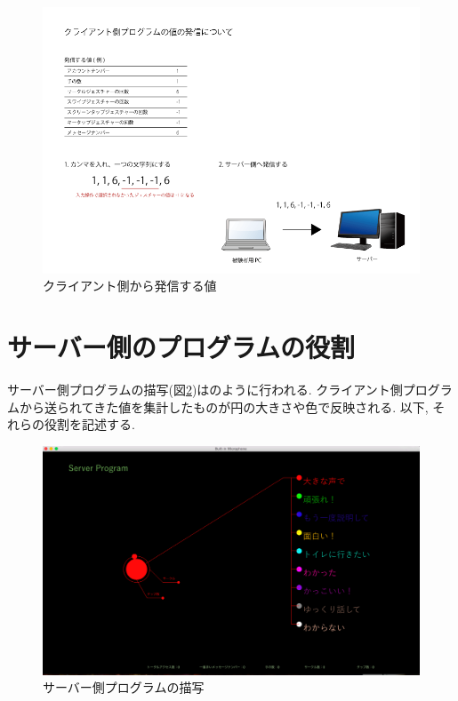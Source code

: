 \documentclass{funthesis}
\begin{document}
\begin{figure}[H]
 \begin{center}
  \includegraphics[width=120mm]{./img/sendCL.png}
 \end{center}
 \caption{クライアント側から発信する値}
 \label{send}
\end{figure}

\section{サーバー側のプログラムの役割}
サーバー側プログラムの描写(図\ref{server})はのように行われる. クライアント側プログラムから送られてきた値を集計したものが円の大きさや色で反映される. 以下, それらの役割を記述する. 
 \begin{figure}[H]
 \begin{center}
  \includegraphics[width=120mm]{./img/server.png}
 \end{center}
 \caption{サーバー側プログラムの描写}
 \label{server}
\end{figure}
\end{document}
